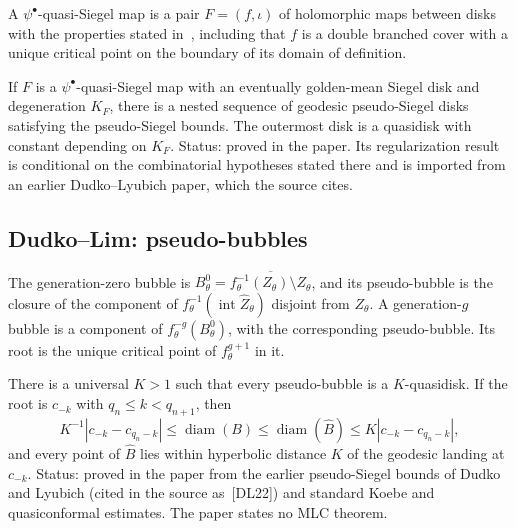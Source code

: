 \begin{definition}
\label{def:psi-ql-siegel}
A $\psi^\bullet$-quasi-Siegel map is a pair $F=(f,\iota)$ of holomorphic maps between
disks with the properties stated in~\cite{DudkoLuoLyubichNeutral}, including that
$f$ is a double branched cover with a unique critical point on the boundary of its
domain of definition.
\end{definition}

\begin{theorem}
\label{thm:dll-psi}
If $F$ is a $\psi^\bullet$-quasi-Siegel map with an eventually golden-mean Siegel
disk and degeneration $K_F$, there is a nested sequence of geodesic pseudo-Siegel
disks satisfying the pseudo-Siegel bounds.  The outermost disk is a quasidisk with
constant depending on $K_F$.  Status: proved in the paper.  Its regularization result is conditional on the
combinatorial hypotheses stated there and is imported from an earlier
Dudko--Lyubich paper, which the source cites.
\end{theorem}

\subsection*{Dudko--Lim: pseudo-bubbles}

\begin{definition}
\label{def:bubbles}
The generation-zero bubble is $B^0_\theta=\overline{f_\theta^{-1}(Z_\theta)\setminus Z_\theta}$,
and its pseudo-bubble is the closure of the component of $f_\theta^{-1}(\operatorname{int}\widehat Z_\theta)$
disjoint from $Z_\theta$.  A generation-$g$ bubble is a component of $f_\theta^{-g}(B^0_\theta)$,
with the corresponding pseudo-bubble.  Its root is the unique critical point of
$f_\theta^{g+1}$ in it.
\end{definition}

\begin{theorem}
\label{thm:dl-bubbles}
There is a universal $K>1$ such that every pseudo-bubble is a $K$-quasidisk.  If the
root is $c_{-k}$ with $q_n\le k<q_{n+1}$, then
\[
 K^{-1}|c_{-k}-c_{q_n-k}|\le\operatorname{diam}(B)\le\operatorname{diam}(\widehat B)
 \le K|c_{-k}-c_{q_n-k}|,
\]
and every point of $\widehat B$ lies within hyperbolic distance $K$ of the geodesic
landing at $c_{-k}$.  Status: proved in the paper from the earlier pseudo-Siegel bounds of Dudko and
Lyubich (cited in the source as~[DL22]) and standard Koebe and quasiconformal
estimates.  The paper states no MLC theorem.
\end{theorem}

